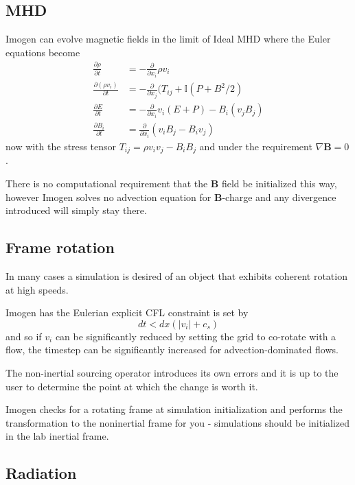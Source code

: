 \documentclass[letterpaper,12pt]{article}
\begin{document}
\subsection{MHD}

Imogen can evolve magnetic fields in the limit of Ideal MHD where the Euler equations
become
\begin{align*}
\frac{\partial \rho}{\partial t} &= -\frac{\partial}{\partial x_i} \rho v_i \\
\frac{\partial (\rho v_i)}{\partial t} &= -\frac{\partial}{\partial x_j} (T_{ij} + \mathbb{I}(P+B^2/2) \\
\frac{\partial E}{\partial t} &= -\frac{\partial}{\partial x_i} v_i (E + P) - B_i (v_j B_j) \\
\frac{\partial B_i}{\partial t} &= \frac{\partial}{\partial x_i} (v_i B_j - B_i v_j)
\end{align*}
now with the stress tensor $T_{ij} = \rho v_i v_j - B_i B_j$ and under the requirement
$\nabla \mathbf{B} = 0$.

There is no computational requirement that the \textbf{B} field be initialized this way,
however Imogen solves no advection equation for $\mathbf{B}$-charge and any divergence
introduced will simply stay there.

\subsection{Frame rotation}

In many cases a simulation is desired of an object that exhibits coherent rotation at
high speeds.

Imogen has the Eulerian explicit CFL constraint is set by
\[ dt < dx (|v_i| + c_s) \]
and so if $v_i$ can be significantly reduced by setting the grid to co-rotate with a flow,
the timestep can be significantly increased for advection-dominated flows.

The non-inertial sourcing operator introduces its own errors and it is up to the user to
determine the point at which the change is worth it.

Imogen checks for a rotating frame at simulation initialization and performs the
transformation to the noninertial frame for you - simulations should be initialized
in the lab inertial frame.

\subsection{Radiation}
\end{document}
